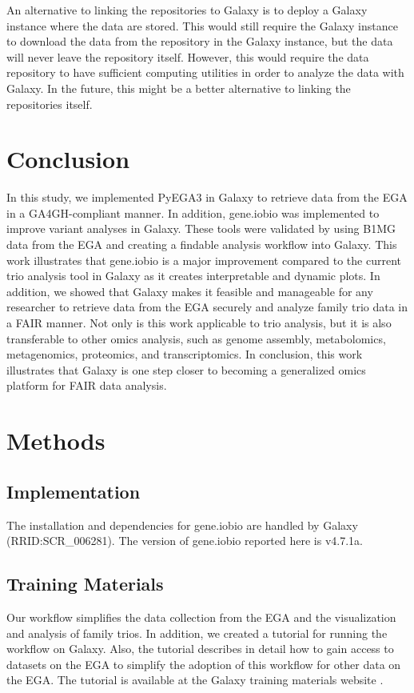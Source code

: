 An alternative to linking the repositories to Galaxy is to deploy a Galaxy instance where the data are stored. This would still require the Galaxy instance to download the data from the repository in the Galaxy instance, but the data will never leave the repository itself. However, this would require the data repository to have sufficient computing utilities in order to analyze the data with Galaxy. In the future, this might be a better alternative to linking the repositories itself.

\section*{Conclusion}
In this study, we implemented PyEGA3 in Galaxy to retrieve data from the EGA in a GA4GH-compliant manner. In addition, gene.iobio was implemented to improve variant analyses in Galaxy. These tools were validated by using B1MG data from the EGA and creating a findable analysis workflow into Galaxy. This work illustrates that gene.iobio is a major improvement compared to the current trio analysis tool in Galaxy as it creates interpretable and dynamic plots. In addition, we showed that Galaxy makes it feasible and manageable for any researcher to retrieve data from the EGA securely and analyze family trio data in a FAIR manner. Not only is this work applicable to trio analysis, but it is also transferable to other omics analysis, such as genome assembly, metabolomics, metagenomics, proteomics, and transcriptomics. In conclusion, this work illustrates that Galaxy is one step closer to becoming a generalized omics platform for FAIR data analysis.

\section*{Methods}
\subsection*{Implementation}
The installation and dependencies for gene.iobio are handled by Galaxy (RRID:SCR\_006281). The version of gene.iobio reported here is v4.7.1a.

\subsection*{Training Materials}
Our workflow simplifies the data collection from the EGA and the visualization and analysis of family trios. In addition, we created a tutorial for running the workflow on Galaxy. Also, the tutorial describes in detail how to gain access to datasets on the EGA to simplify the adoption of this workflow for other data on the EGA. The tutorial is available at the Galaxy training materials website \cite{tutorial}.

